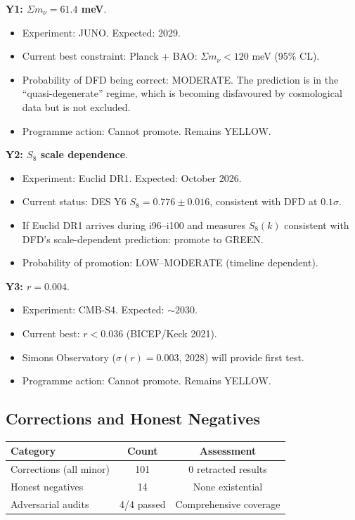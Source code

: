 \documentclass[11pt,a4paper]{article}
\begin{document}
\begin{tcolorbox}[colback=yellow!10!white, colframe=dfdyellow, title=\textbf{YELLOW Items: Current Assessment}]

\textbf{Y1: $\Sigma m_\nu = 61.4$ meV}.
\begin{itemize}[nosep]
\item Experiment: JUNO. Expected: 2029.
\item Current best constraint: Planck + BAO: $\Sigma m_\nu < 120$ meV (95\% CL).
\item Probability of DFD being correct: MODERATE. The prediction is in the ``quasi-degenerate'' regime, which is becoming disfavoured by cosmological data but is not excluded.
\item Programme action: Cannot promote. Remains YELLOW.
\end{itemize}

\textbf{Y2: $S_8$ scale dependence}.
\begin{itemize}[nosep]
\item Experiment: Euclid DR1. Expected: October 2026.
\item Current status: DES Y6 $S_8 = 0.776 \pm 0.016$, consistent with DFD at $0.1\sigma$.
\item If Euclid DR1 arrives during i96--i100 and measures $S_8(k)$ consistent with DFD's scale-dependent prediction: promote to GREEN.
\item Probability of promotion: LOW--MODERATE (timeline dependent).
\end{itemize}

\textbf{Y3: $r = 0.004$}.
\begin{itemize}[nosep]
\item Experiment: CMB-S4. Expected: $\sim 2030$.
\item Current best: $r < 0.036$ (BICEP/Keck 2021).
\item Simons Observatory ($\sigma(r) = 0.003$, 2028) will provide first test.
\item Programme action: Cannot promote. Remains YELLOW.
\end{itemize}
\end{tcolorbox}

\subsection{Corrections and Honest Negatives}

\begin{center}
\begin{tabular}{lcc}
\toprule
\textbf{Category} & \textbf{Count} & \textbf{Assessment} \\
\midrule
Corrections (all minor) & 101 & 0 retracted results \\
Honest negatives & 14 & None existential \\
Adversarial audits & 4/4 passed & Comprehensive coverage \\
\bottomrule
\end{tabular}
\end{center}
\end{document}
